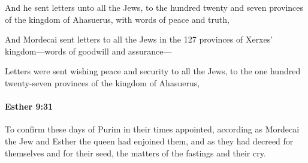 			\begin{versebox}
					\item[BHS] 
					\item[LXX] 
					\item[ASV] And he sent letters unto all the Jews, to the hundred twenty and seven provinces of the kingdom of Ahasuerus, with words of peace and truth,
					\item[NIV] And Mordecai sent letters to all the Jews in the 127 provinces of Xerxes’ kingdom—words of goodwill and assurance—
					\item[NRSV] Letters were sent wishing peace and security to all the Jews, to the one hundred twenty-seven provinces of the kingdom of Ahasuerus,
			\end{versebox}

		\paragraph{Esther 9:31} %
			\label{ESTHER-9-31}

			To confirm these days of Purim in their times appointed, according as Mordecai the Jew and Esther the queen had enjoined them, and as they had decreed for themselves and for their seed, the matters of the fastings and their cry.

